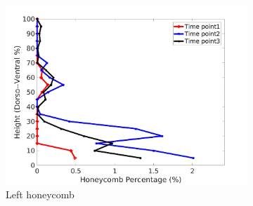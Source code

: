 \begin{figure}[H]
\begin{subfigure}{.42\linewidth}
  \includegraphics[width=\linewidth,trim={{.0\wd0} {.0\wd0} {.0\wd0} {.0\wd0}},clip]{Appendix/Image_AppexA/DorsoToVentral/IPF21LeftLungHoneycombDiseaseDorsoToVentral.jpg} %
  \caption{Left honeycomb}
  \label{fig:IPF21DiseaseDorsoToVentral-e} 
\end{subfigure} 
\begin{subfigure}{.42\linewidth}%

\end{subfigure}
\end{figure}
